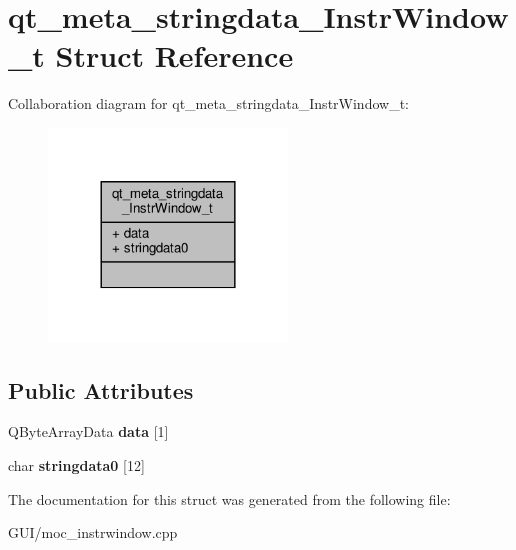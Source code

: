 \hypertarget{structqt__meta__stringdata__InstrWindow__t}{}\section{qt\+\_\+meta\+\_\+stringdata\+\_\+\+Instr\+Window\+\_\+t Struct Reference}
\label{structqt__meta__stringdata__InstrWindow__t}


Collaboration diagram for qt\+\_\+meta\+\_\+stringdata\+\_\+\+Instr\+Window\+\_\+t\+:
\nopagebreak
\begin{figure}[H]
\begin{center}
\leavevmode
\includegraphics[width=180pt]{structqt__meta__stringdata__InstrWindow__t__coll__graph}
\end{center}
\end{figure}
\subsection*{Public Attributes}
\begin{DoxyCompactItemize}
\item 
\mbox{\label{structqt__meta__stringdata__InstrWindow__t_a0feada0e76f84b36793684a89209a1e0}} 
Q\+Byte\+Array\+Data {\bfseries data} \mbox{[}1\mbox{]}
\item 
\mbox{\label{structqt__meta__stringdata__InstrWindow__t_a74481be3db9805b98cb6378e1505dfc4}} 
char {\bfseries stringdata0} \mbox{[}12\mbox{]}
\end{DoxyCompactItemize}


The documentation for this struct was generated from the following file\+:\begin{DoxyCompactItemize}
\item 
G\+U\+I/moc\+\_\+instrwindow.\+cpp\end{DoxyCompactItemize}
